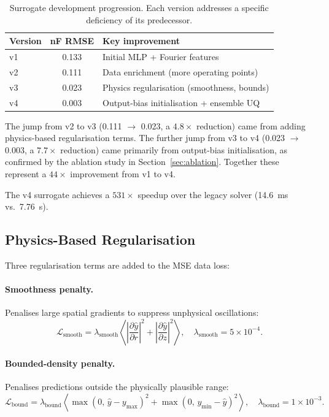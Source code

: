 \documentclass[12pt,a4paper]{article}
\begin{document}
\begin{table}[H]
  \centering
  \caption{Surrogate development progression.  Each version
           addresses a specific deficiency of its predecessor.}
  \label{tab:progression}
  \begin{tabular}{lcl}
    \toprule
    Version & nF RMSE & Key improvement \\
    \midrule
    v1 & 0.133 & Initial MLP + Fourier features \\
    v2 & 0.111 & Data enrichment (more operating points) \\
    v3 & 0.023 & Physics regularisation (smoothness, bounds) \\
    v4 & 0.003 & Output-bias initialisation + ensemble UQ \\
    \bottomrule
  \end{tabular}
\end{table}

The jump from v2 to v3 (0.111 $\to$ 0.023, a $4.8\times$ reduction)
came from adding physics-based regularisation terms.  The further jump
from v3 to v4 (0.023 $\to$ 0.003, a $7.7\times$ reduction) came
primarily from output-bias initialisation, as confirmed by the
ablation study in Section~\ref{sec:ablation}.  Together these
represent a $44\times$ improvement from v1 to v4.

The v4 surrogate achieves a $531\times$ speedup over the legacy
solver (\SI{14.6}{\milli\second} vs.\ \SI{7.76}{\second}).

\subsection{Physics-Based Regularisation}

Three regularisation terms are added to the MSE data loss:

\paragraph{Smoothness penalty.}
Penalises large spatial gradients to suppress unphysical oscillations:
\begin{equation}
  \mathcal{L}_{\text{smooth}}
  = \lambda_{\text{smooth}}
    \left\langle
      \left|\frac{\partial \hat{y}}{\partial r}\right|^2
      + \left|\frac{\partial \hat{y}}{\partial z}\right|^2
    \right\rangle,
  \quad \lambda_{\text{smooth}} = 5 \times 10^{-4}.
  \label{eq:smooth}
\end{equation}

\paragraph{Bounded-density penalty.}
Penalises predictions outside the physically plausible range:
\begin{equation}
  \mathcal{L}_{\text{bound}}
  = \lambda_{\text{bound}}
    \left\langle
      \max(0,\, \hat{y} - y_{\max})^2
      + \max(0,\, y_{\min} - \hat{y})^2
    \right\rangle,
  \quad \lambda_{\text{bound}} = 1 \times 10^{-3}.
  \label{eq:bound}
\end{equation}
\end{document}

